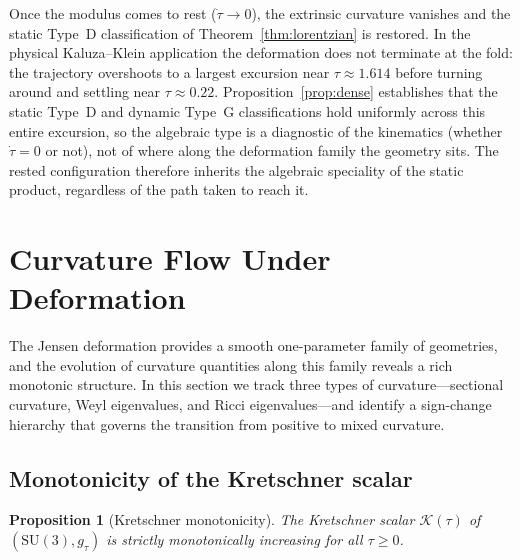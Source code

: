 \documentclass[12pt]{article}
\newtheorem{proposition}[theorem]{Proposition}
\theoremstyle{definition}
\theoremstyle{remark}
\begin{document}
Once the modulus comes to rest ($\dot{\tau}\to0$), the extrinsic curvature vanishes and the static Type~D classification of Theorem~\ref{thm:lorentzian} is restored.  In the physical Kaluza--Klein application the deformation does not terminate at the fold: the trajectory overshoots to a largest excursion near $\tau\approx1.614$ before turning around and settling near $\tau\approx0.22$.  Proposition~\ref{prop:dense} establishes that the static Type~D and dynamic Type~G classifications hold uniformly across this entire excursion, so the algebraic type is a diagnostic of the kinematics (whether $\dot{\tau}=0$ or not), not of where along the deformation family the geometry sits.  The rested configuration therefore inherits the algebraic speciality of the static product, regardless of the path taken to reach it.

\section{Curvature Flow Under Deformation}
\label{sec:flow}

The Jensen deformation provides a smooth one-parameter family of geometries, and the evolution of curvature quantities along this family reveals a rich monotonic structure.  In this section we track three types of curvature---sectional curvature, Weyl eigenvalues, and Ricci eigenvalues---and identify a sign-change hierarchy that governs the transition from positive to mixed curvature.

\subsection{Monotonicity of the Kretschner scalar}

\begin{proposition}[Kretschner monotonicity]
\label{prop:kretschner}
The Kretschner scalar $\mathcal{K}(\tau)$ of $(\mathrm{SU}(3),g_\tau)$ is strictly monotonically increasing for all $\tau\geq 0$.
\end{proposition}
\end{document}
